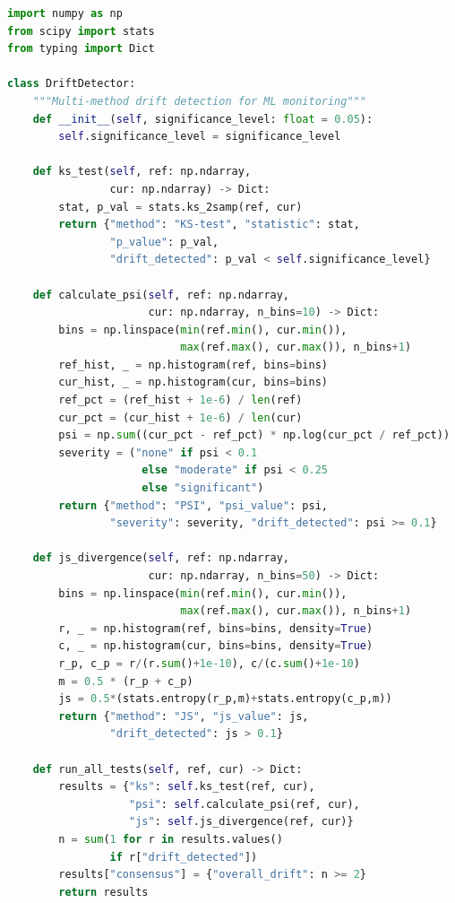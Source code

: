 \begin{lstlisting}[language=Python, caption={Comprehensive Drift Detection with Multiple Statistical Tests}, label={lst:drift_detection}]
import numpy as np
from scipy import stats
from typing import Dict

class DriftDetector:
    """Multi-method drift detection for ML monitoring"""
    def __init__(self, significance_level: float = 0.05):
        self.significance_level = significance_level

    def ks_test(self, ref: np.ndarray,
                cur: np.ndarray) -> Dict:
        stat, p_val = stats.ks_2samp(ref, cur)
        return {"method": "KS-test", "statistic": stat,
                "p_value": p_val,
                "drift_detected": p_val < self.significance_level}

    def calculate_psi(self, ref: np.ndarray,
                      cur: np.ndarray, n_bins=10) -> Dict:
        bins = np.linspace(min(ref.min(), cur.min()),
                           max(ref.max(), cur.max()), n_bins+1)
        ref_hist, _ = np.histogram(ref, bins=bins)
        cur_hist, _ = np.histogram(cur, bins=bins)
        ref_pct = (ref_hist + 1e-6) / len(ref)
        cur_pct = (cur_hist + 1e-6) / len(cur)
        psi = np.sum((cur_pct - ref_pct) * np.log(cur_pct / ref_pct))
        severity = ("none" if psi < 0.1
                     else "moderate" if psi < 0.25
                     else "significant")
        return {"method": "PSI", "psi_value": psi,
                "severity": severity, "drift_detected": psi >= 0.1}

    def js_divergence(self, ref: np.ndarray,
                      cur: np.ndarray, n_bins=50) -> Dict:
        bins = np.linspace(min(ref.min(), cur.min()),
                           max(ref.max(), cur.max()), n_bins+1)
        r, _ = np.histogram(ref, bins=bins, density=True)
        c, _ = np.histogram(cur, bins=bins, density=True)
        r_p, c_p = r/(r.sum()+1e-10), c/(c.sum()+1e-10)
        m = 0.5 * (r_p + c_p)
        js = 0.5*(stats.entropy(r_p,m)+stats.entropy(c_p,m))
        return {"method": "JS", "js_value": js,
                "drift_detected": js > 0.1}

    def run_all_tests(self, ref, cur) -> Dict:
        results = {"ks": self.ks_test(ref, cur),
                   "psi": self.calculate_psi(ref, cur),
                   "js": self.js_divergence(ref, cur)}
        n = sum(1 for r in results.values()
                if r["drift_detected"])
        results["consensus"] = {"overall_drift": n >= 2}
        return results
\end{lstlisting}

